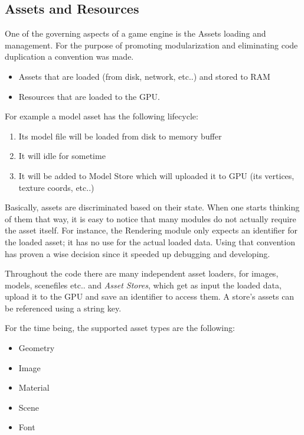 \subsection{Assets and Resources}
One of the governing aspects of a game engine is the Assets loading and management. For the
purpose of promoting modularization and eliminating code duplication a convention was made.

\begin{itemize}
\item Assets that are loaded (from disk, network, etc..) and stored to RAM
\item Resources that are loaded to the GPU\@.
\end{itemize}

\noindent For example a model asset has the following lifecycle:

\begin{enumerate}
\item Its model file will be loaded from disk to memory buffer
\item It will idle for sometime
\item It will be added to Model Store which will uploaded it to GPU (its vertices, texture coords,
      etc..)
\end{enumerate}

Basically, assets are discriminated based on their state. When one starts thinking of them that
way, it is easy to notice that many modules do not actually require the asset itself. For
instance, the Rendering module only expects an identifier for the loaded asset; it has no use
for the actual loaded data. Using that convention has proven a wise decision since it speeded
up debugging and developing.

Throughout the code there are many independent asset loaders, for images, models, scenefiles etc..
and \textit{Asset Stores}, which get as input the loaded data, upload it to the GPU and save an
identifier to access them. A store's assets can be referenced using a string key.

\noindent For the time being, the supported asset types are the following:

\begin{itemize}
\item Geometry
\item Image
\item Material
\item Scene
\item Font
\end{itemize}

